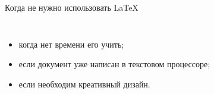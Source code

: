 \begin{frame}{Когда не нужно использовать \LaTeX}
\begin{columns}
        \begin{itemize}
            \pause\item когда нет времени его учить;
            \pause\item если документ уже написан в текстовом процессоре;
            \pause\item если необходим креативный дизайн.
        \end{itemize}
    \end{columns}
\end{frame}

